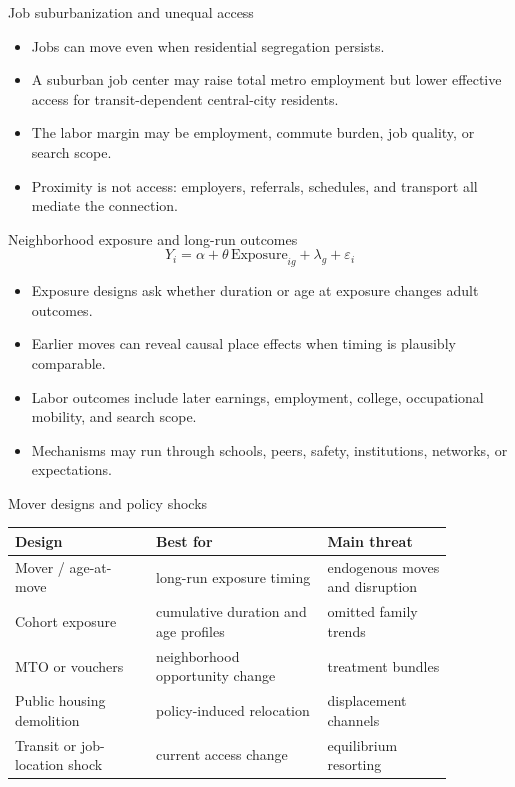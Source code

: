 \documentclass[aspectratio=169,11pt]{beamer}
\begin{document}
\begin{frame}{Job suburbanization and unequal access}
\begin{itemize}
    \item Jobs can move even when residential segregation persists.
    \item A suburban job center may raise total metro employment but lower effective access for transit-dependent central-city residents.
    \item The labor margin may be employment, commute burden, job quality, or search scope.
    \item Proximity is not access: employers, referrals, schedules, and transport all mediate the connection.
\end{itemize}
\end{frame}

\begin{frame}{Neighborhood exposure and long-run outcomes}
\[
Y_i = \alpha + \theta \, \text{Exposure}_{ig} + \lambda_g + \varepsilon_i
\]
\begin{itemize}
    \item Exposure designs ask whether duration or age at exposure changes adult outcomes.
    \item Earlier moves can reveal causal place effects when timing is plausibly comparable.
    \item Labor outcomes include later earnings, employment, college, occupational mobility, and search scope.
    \item Mechanisms may run through schools, peers, safety, institutions, networks, or expectations.
\end{itemize}
\end{frame}

\begin{frame}{Mover designs and policy shocks}
\small
\begin{tabular}{p{0.28\linewidth} p{0.34\linewidth} p{0.25\linewidth}}
\toprule
Design & Best for & Main threat \\
\midrule
Mover / age-at-move & long-run exposure timing & endogenous moves and disruption \\
Cohort exposure & cumulative duration and age profiles & omitted family trends \\
MTO or vouchers & neighborhood opportunity change & treatment bundles \\
Public housing demolition & policy-induced relocation & displacement channels \\
Transit or job-location shock & current access change & equilibrium resorting \\
\bottomrule
\end{tabular}
\end{frame}
\end{document}
